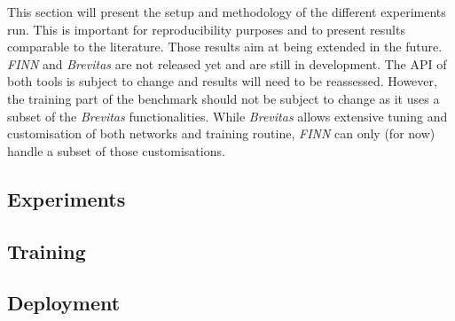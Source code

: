 This section will present the setup and methodology of the different experiments run. This is important for reproducibility purposes and to present results comparable to the literature. Those results aim at being extended in the future. \emph{FINN} and \emph{Brevitas} are not released yet and are still in development. The API of both tools is subject to change and results will need to be reassessed. However, the training part of the benchmark should not be subject to change as it uses a subset of the \emph{Brevitas} functionalities. While \emph{Brevitas} allows extensive tuning and customisation of both networks and training routine, \emph{FINN} can only (for now) handle a subset of those customisations.


\subsection{Experiments}


\subsection{Training}


\subsection{Deployment}
